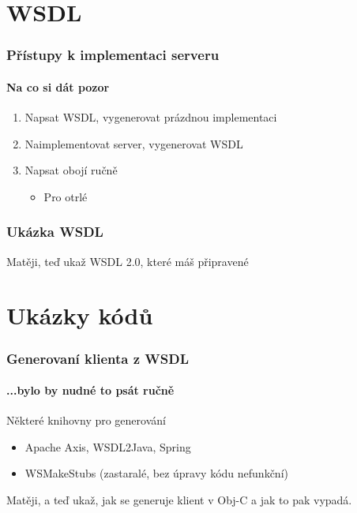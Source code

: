 \documentclass[12pt]{beamer}
\begin{document}
\section{WSDL}

\begin{frame}
  \frametitle{Přístupy k implementaci serveru}
  \framesubtitle{Na co si dát pozor}

  \begin{enumerate}
    \item Napsat WSDL, vygenerovat prázdnou implementaci
    \vspace{4mm}
    \item Naimplementovat server, vygenerovat WSDL
    \vspace{4mm}
    \item Napsat obojí ručně
    \begin{itemize}
      \item Pro otrlé
    \end{itemize}
  \end{enumerate}
\end{frame}

\begin{frame}
  \frametitle{Ukázka WSDL}

  \begin{example}
    Matěji, teď ukaž WSDL 2.0, které máš připravené
  \end{example}
\end{frame}

\section{Ukázky kódů}

\begin{frame}
  \frametitle{Generovaní klienta z WSDL}
  \framesubtitle{...bylo by nudné to psát ručně}

	\begin{block}{Některé knihovny pro generování}
		\begin{itemize}
			\item {} Apache Axis, WSDL2Java, Spring
			\item {} WSMakeStubs (zastaralé, bez úpravy kódu nefunkční)
		\end{itemize}    	
  \end{block}
	\begin{example}
		Matěji, a teď ukaž, jak se generuje klient v Obj-C a jak to pak vypadá.
	\end{example}
\end{frame}
\end{document}
